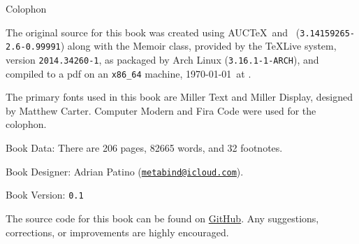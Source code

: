 
\cleartoverso
\pagestyle{empty}

\newlength{\colophon}
\calccentering{\colophon}
\begin{adjustwidth*}{\colophon}{\colophon}

\begin{flushleft}
\setlength{\parskip}{1.5\baselineskip}
{\large Colophon}

The original source for this book was created using AUC\TeX\ and
\XeLaTeX\ (\texttt{3.14159265-2.6-0.99991}) along with the Memoir
class, provided by the \TeX Live system, version
\texttt{2014.34260-1}, as packaged by Arch Linux
(\texttt{3.16.1-1-ARCH}), and compiled to a pdf on an
\texttt{x86\_64} machine, \today\ at \printtime*.

The primary fonts used in this book are Miller Text and Miller
Display, designed by Matthew Carter.  Computer Modern and Fira Code
were used for the colophon.

Book Data: There are 206 pages, 82665 words, and 32 footnotes. 

Book Designer: Adrian Patino
(\href{mailto:metabind@icloud.com}{\texttt{metabind@icloud.com}}).

Book Version: \texttt{0.1}

The source code for this book can be found on
\href{https://github.com/metabind/spirit-hazlitt}{GitHub}.  Any
suggestions, corrections, or improvements are highly encouraged.


\end{flushleft}
\end{adjustwidth*}
